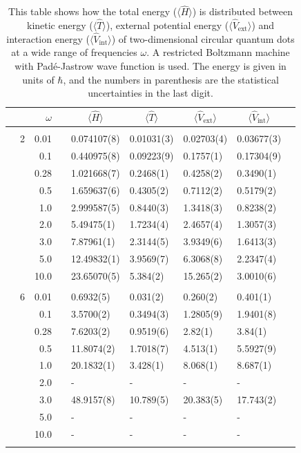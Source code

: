 \begin{table}
	\caption{This table shows how the total energy ($\langle\hat{H}\rangle$) is distributed between kinetic energy ($\langle\hat{T}\rangle$), external potential energy ($\langle\hat{V}_{\text{ext}}\rangle$) and interaction energy ($\langle\hat{V}_{\text{int}}\rangle$) of two-dimensional circular quantum dots at a wide range of frequencies $\omega$. A restricted Boltzmann machine with Padé-Jastrow wave function is used. The energy is given in units of $\hbar$, and the numbers in parenthesis are the statistical uncertainties in the last digit.}
	\label{tab:splitfrequencyQDRBMPJ}
	\begin{tabularx}{\textwidth}{R{1cm}rrcR{2.3cm}R{2.3cm}R{2.3cm}R{2.3cm}R{1cm}} \hline\hline
		&\makecell{\\ \phantom{$N$} \\ \phantom{=}} & $\omega$ &&  &  &  &  & \\ \hline \\
		&2 & 0.01 && 0.074107(8) & 0.01031(3) & 0.02703(4) & 0.03677(3) \\
		&& 0.1 && 0.440975(8) & 0.09223(9) & 0.1757(1) & 0.17304(9) \\
		&& 0.28 && 1.021668(7) & 0.2468(1) & 0.4258(2) & 0.3490(1) \\
		&& 0.5 && 1.659637(6) & 0.4305(2) & 0.7112(2) & 0.5179(2) \\
		&& 1.0 && 2.999587(5) & 0.8440(3) & 1.3418(3) & 0.8238(2) \\
		&& 2.0 && 5.49475(1) & 1.7234(4) & 2.4657(4) & 1.3057(3) \\
		&& 3.0 && 7.87961(1) & 2.3144(5) & 3.9349(6) & 1.6413(3) \\
		&& 5.0 && 12.49832(1) & 3.9569(7) & 6.3068(8) & 2.2347(4) \\
		&& 10.0 && 23.65070(5) & 5.384(2) & 15.265(2) & 3.0010(6) \\
		\hdashline \\
		
		&6 & 0.01 && 0.6932(5) & 0.031(2) & 0.260(2) & 0.401(1) \\
		&& 0.1 && 3.5700(2) & 0.3494(3) & 1.2805(9) & 1.9401(8) \\
		&& 0.28 && 7.6203(2) & 0.9519(6) & 2.82(1) & 3.84(1) \\
		&& 0.5 && 11.8074(2) & 1.7018(7) & 4.513(1) & 5.5927(9) \\
		&& 1.0 && 20.1832(1) & 3.428(1) & 8.068(1) & 8.687(1) \\
		&& 2.0 && - & - & - & -\\
		&& 3.0 && 48.9157(8) & 10.789(5) & 20.383(5) & 17.743(2) \\ 
		&& 5.0 && - & - & - & -\\
		&& 10.0 && - & - & - & -\\
		\hdashline \\
		

\end{tabularx}
\end{table}
